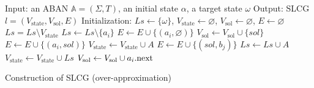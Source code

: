 \begin{algorithm}[ht]
\begin{algorithmic}
    \State Input: an ABAN $\mathbb{A}=(\Sigma,T)$, an initial state $\alpha$, a target state $\omega$
    \State Output: SLCG $l=(V_{\mathrm{state}},V_{\mathrm{sol}}, E)$
    \State Initialization: 
    $Ls\gets \{\omega\}$, $V_{\mathrm{state}}\gets\varnothing$, $V_{\mathrm{sol}}\gets \varnothing$, $E\gets \varnothing$
        \State $Ls=Ls\setminus V_{\mathrm{state}}$
    		\State $Ls\gets Ls\setminus \{a_i\}$
    			\State $E\gets E\cup \{(a_i,\varnothing)\} $
        	\Else
        	    \State{\textcolor{gray}{// Choose the transitions reaching $a_i$}}
        		    \State $V_{\mathrm{sol}}\gets V_{\mathrm{sol}}\cup \{sol\}$
        		    \State $E\gets E\cup \{(a_i,sol)\} $
        			\State $V_{\mathrm{state}}\gets V_{\mathrm{state}}\cup {A}$
        				\State $E\gets E\cup \{(sol,b_j)\} $
        			\EndFor
        			\State $Ls\gets Ls\cup A$
                    \State $V_{\mathrm{state}}\gets V_{\mathrm{state}}\cup Ls$
        		\EndFor
        		\State$V_{\mathrm{sol}}\gets V_{\mathrm{sol}}\cup a_i{\rm .next}$           
        	\EndIf
    	\EndFor
    \EndWhile
    \State{}
\end{algorithmic}
\caption{Construction of SLCG (over-approximation)}\label{AlgConstructLCG}
\end{algorithm}

